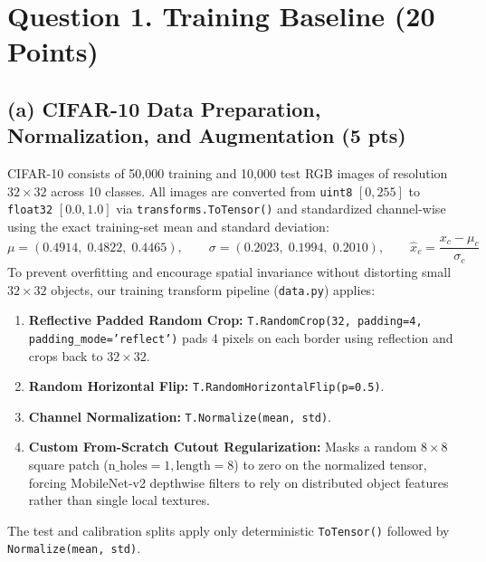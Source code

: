 \documentclass[11pt,a4paper]{article}
\begin{document}
\vspace{0.3cm}

\section*{Question 1. Training Baseline (20 Points)}

\subsection*{(a) CIFAR-10 Data Preparation, Normalization, and Augmentation (5 pts)}
CIFAR-10 consists of 50,000 training and 10,000 test RGB images of resolution $32\times 32$ across 10 classes. All images are converted from \texttt{uint8} $[0, 255]$ to \texttt{float32} $[0.0, 1.0]$ via \texttt{transforms.ToTensor()} and standardized channel-wise using the exact training-set mean and standard deviation:
\[
\mu = (0.4914,\; 0.4822,\; 0.4465), \qquad \sigma = (0.2023,\; 0.1994,\; 0.2010), \qquad \hat{x}_c = \frac{x_c - \mu_c}{\sigma_c}
\]
To prevent overfitting and encourage spatial invariance without distorting small $32\times 32$ objects, our training transform pipeline (\texttt{data.py}) applies:
\begin{enumerate}\setlength\itemsep{2pt}
    \item \textbf{Reflective Padded Random Crop:} \texttt{T.RandomCrop(32, padding=4, padding\_mode='reflect')} pads 4 pixels on each border using reflection and crops back to $32\times 32$.
    \item \textbf{Random Horizontal Flip:} \texttt{T.RandomHorizontalFlip(p=0.5)}.
    \item \textbf{Channel Normalization:} \texttt{T.Normalize(mean, std)}.
    \item \textbf{Custom From-Scratch Cutout Regularization:} Masks a random $8\times 8$ square patch ($\text{n\_holes}=1, \text{length}=8$) to zero on the normalized tensor, forcing MobileNet-v2 depthwise filters to rely on distributed object features rather than single local textures.
\end{enumerate}
The test and calibration splits apply only deterministic \texttt{ToTensor()} followed by \texttt{Normalize(mean, std)}.
\end{document}
